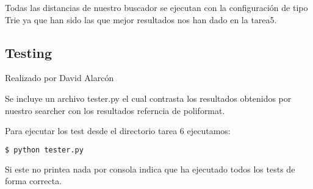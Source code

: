 Todas las distancias de nuestro buscador se ejecutan con la configuración de tipo Trie ya que han sido las que mejor resultados nos han dado en la tarea5.

\newpage

\subsection{Testing}
{\color{red}Realizado por David Alarcón}

Se incluye un archivo tester.py el cual contrasta los resultados obtenidos por nuestro searcher con los resultados referncia de poliformat.

Para ejecutar los test desde el directorio tarea 6 ejecutamos:

\begin{lstlisting}[language=bash]
    $ python tester.py
\end{lstlisting}

Si este no printea nada por consola indica que ha ejecutado todos los tests de forma correcta.

\newpage